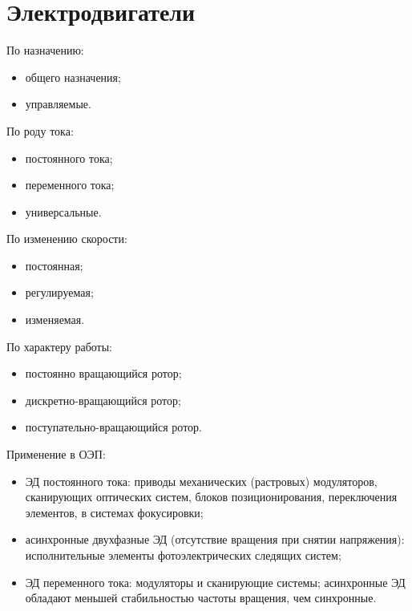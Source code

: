 \chapter{Электродвигатели}

По назначению:
\begin{itemize}
	\item общего назначения;
	\item управляемые.
\end{itemize}

По роду тока:
\begin{itemize}
	\item постоянного тока;
	\item переменного тока;
	\item универсальные.
\end{itemize}

По изменению скорости:
\begin{itemize}
	\item постоянная;
	\item регулируемая;
	\item изменяемая.
\end{itemize}

По характеру работы:
\begin{itemize}
	\item постоянно вращающийся ротор;
	\item дискретно-вращающийся ротор;
	\item поступательно-вращающийся ротор.
\end{itemize}

Применение в ОЭП:
\begin{itemize}
	\item ЭД постоянного тока: приводы механических (растровых) модуляторов, сканирующих оптических систем, блоков позиционирования, переключения элементов, в системах фокусировки;
	\item асинхронные двухфазные ЭД (отсутствие вращения при снятии напряжения): исполнительные элементы фотоэлектрических следящих систем;
	\item ЭД переменного тока: модуляторы и сканирующие системы; асинхронные ЭД обладают меньшей стабильностью частоты вращения, чем синхронные.
\end{itemize}

